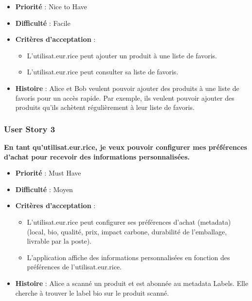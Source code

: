 \begin{itemize}[noitemsep]
    \item \textbf{Priorité} : Nice to Have
    \item \textbf{Difficulté} : Facile
    \item \textbf{Critères d'acceptation} :
          \begin{itemize}[noitemsep]
              \item L'utilisat.eur.rice peut ajouter un produit à une liste de favoris.
              \item L'utilisat.eur.rice peut consulter sa liste de favoris.
          \end{itemize}
    \item \textbf{Histoire} : Alice et Bob veulent pouvoir ajouter des produits à une liste de favoris pour un accès rapide. Par exemple, ils veulent pouvoir ajouter des produits qu'ils achètent régulièrement à leur liste de favoris.
\end{itemize}

\subsubsection{User Story 3}

\textbf{En tant qu'utilisat.eur.rice, je veux pouvoir configurer mes préférences d'achat pour recevoir des informations personnalisées.}

\begin{itemize}[noitemsep]
    \item \textbf{Priorité} : Must Have
    \item \textbf{Difficulté} : Moyen
    \item \textbf{Critères d'acceptation} :
          \begin{itemize}[noitemsep]
              \item L'utilisat.eur.rice peut configurer ses préférences d'achat (metadata) (local, bio, qualité, prix, impact carbone, durabilité de l'emballage, livrable par la poste).
              \item L'application affiche des informations personnalisées en fonction des préférences de l'utilisat.eur.rice.
          \end{itemize}
    \item \textbf{Histoire} : Alice a scanné un produit et est abonnée au metadata Labels. Elle cherche à trouver le label bio sur le produit scanné.
\end{itemize}

